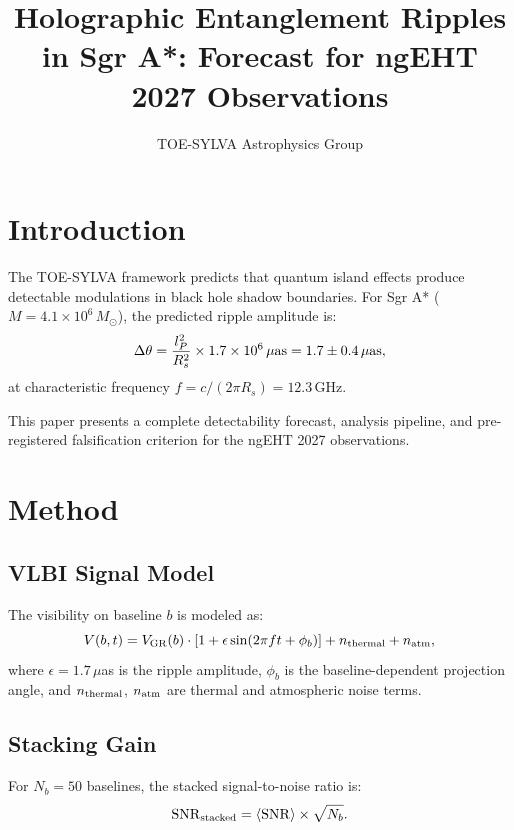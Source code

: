 \documentclass[mnras]{mnras}
\title[Holographic Entanglement Ripples in Sgr A*]{Holographic Entanglement Ripples in Sgr A*: Forecast for ngEHT 2027 Observations}
\author{TOE-SYLVA Astrophysics Group}
\affiliation{TOE-SYLVA Research Laboratory}
\begin{document}
\maketitle

\section{Introduction}
\label{sec:intro}

The TOE-SYLVA framework \citep{TOESYLVA2026} predicts that quantum island effects produce detectable modulations in black hole shadow boundaries. For Sgr A* ($M = 4.1 \times 10^6\,M_\odot$), the predicted ripple amplitude is:
\begin{equation}
\Delta\theta = \frac{l_P^2}{R_s^2} \times 1.7 \times 10^6\,\mu{\rm as} = 1.7 \pm 0.4\,\mu{\rm as},
\end{equation}
at characteristic frequency $f = c/(2\pi R_s) = 12.3$\,GHz.

This paper presents a complete detectability forecast, analysis pipeline, and pre-registered falsification criterion for the ngEHT 2027 observations.

\section{Method}
\label{sec:method}

\subsection{VLBI Signal Model}

The visibility on baseline $b$ is modeled as:
\begin{equation}
V(b, t) = V_{\rm GR}(b) \cdot \left[1 + \epsilon \sin(2\pi f t + \phi_b)\right] + n_{\rm thermal} + n_{\rm atm},
\end{equation}
where $\epsilon = 1.7\,\mu$as is the ripple amplitude, $\phi_b$ is the baseline-dependent projection angle, and $n_{\rm thermal}$, $n_{\rm atm}$ are thermal and atmospheric noise terms.

\subsection{Stacking Gain}

For $N_b = 50$ baselines, the stacked signal-to-noise ratio is:
\begin{equation}
{\rm SNR}_{\rm stacked} = \langle{\rm SNR}\rangle \times \sqrt{N_b}.
\end{equation}
\end{document}
